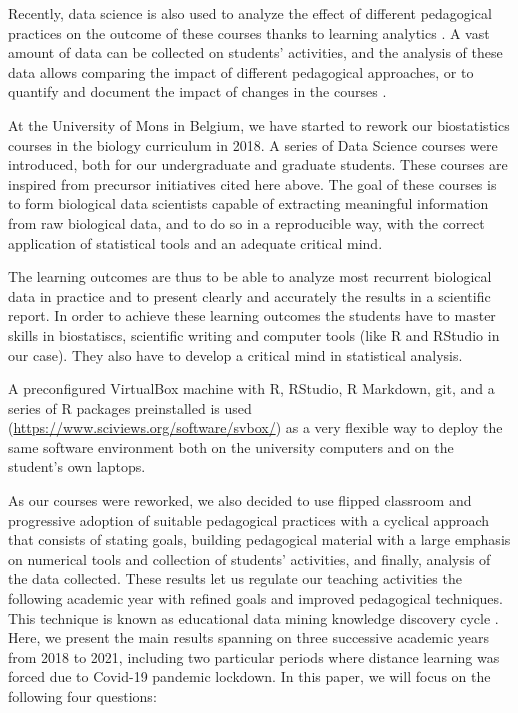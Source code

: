 \documentclass{aims}
\theoremstyle{definition}
\begin{document}
Recently, data science is also used to analyze the effect of different
pedagogical practices on the outcome of these courses thanks to learning
analytics \cite{Estrellado2020}. A vast amount of data can be collected
on students' activities, and the analysis of these data allows comparing
the impact of different pedagogical approaches, or to quantify and
document the impact of changes in the courses \cite{Romero2020}.

At the University of Mons in Belgium, we have started to rework our
biostatistics courses in the biology curriculum in 2018. A series of
Data Science courses were introduced, both for our undergraduate and
graduate students. These courses are inspired from precursor initiatives
cited here above. The goal of these courses is to form biological data
scientists capable of extracting meaningful information from raw
biological data, and to do so in a reproducible way, with the correct
application of statistical tools and an adequate critical mind.

The learning outcomes are thus to be able to analyze most recurrent
biological data in practice and to present clearly and accurately the
results in a scientific report. In order to achieve these learning
outcomes the students have to master skills in biostatiscs, scientific
writing and computer tools (like R and RStudio in our case). They also
have to develop a critical mind in statistical analysis.

A preconfigured VirtualBox machine with R, RStudio, R Markdown, git, and
a series of R packages preinstalled is used
(\url{https://www.sciviews.org/software/svbox/}) as a very flexible way
to deploy the same software environment both on the university computers
and on the student's own laptops.

As our courses were reworked, we also decided to use flipped classroom
and progressive adoption of suitable pedagogical practices with a
cyclical approach that consists of stating goals, building pedagogical
material with a large emphasis on numerical tools and collection of
students' activities, and finally, analysis of the data collected. These
results let us regulate our teaching activities the following academic
year with refined goals and improved pedagogical techniques. This
technique is known as educational data mining knowledge discovery cycle
\cite{Romero2020}. Here, we present the main results spanning on three
successive academic years from 2018 to 2021, including two particular
periods where distance learning was forced due to Covid-19 pandemic
lockdown. In this paper, we will focus on the following four questions:
\end{document}
